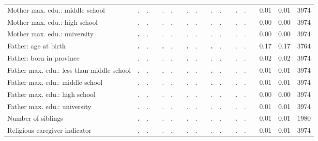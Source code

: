 \begin{tabular}{l c c c c c c c c c c c c c c c c c c}
Mother max. edu.: middle school &         . &         . & &         . &         . & &         . &         . & &         . &         . & & \textbf{        .} &         . & &      0.01 &      0.01 &      3974 \\
Mother max. edu.: high school &         . &         . & &         . &         . & &         . &         . & &         . &         . & & \textbf{        .} &         . & &      0.00 &      0.00 &      3974 \\
Mother max. edu.: university & \textbf{        .} &         . & &         . &         . & &         . &         . & &         . &         . & &         . &         . & &      0.00 &      0.00 &      3974 \\
Father: age at birth & \textbf{        .} &         . & & \textbf{        .} &         . & & \textbf{        .} &         . & & \textbf{        .} &         . & &         . &         . & &      0.17 &      0.17 &      3764 \\
Father: born in province &         . &         . & &         . &         . & & \textbf{        .} &         . & &         . &         . & &         . &         . & &      0.02 &      0.02 &      3974 \\
Father max. edu.: less than middle school & \textbf{        .} &         . & & \textbf{        .} &         . & & \textbf{        .} &         . & & \textbf{        .} &         . & &         . &         . & &      0.01 &      0.01 &      3974 \\
Father max. edu.: middle school &         . &         . & &         . &         . & &         . &         . & & \textbf{        .} &         . & & \textbf{        .} &         . & &      0.01 &      0.01 &      3974 \\
Father max. edu.: high school &         . &         . & &         . &         . & &         . &         . & &         . &         . & & \textbf{        .} &         . & &      0.00 &      0.00 &      3974 \\
Father max. edu.: university &         . &         . & &         . &         . & &         . &         . & &         . &         . & &         . &         . & &      0.01 &      0.01 &      3974 \\
Number of siblings & \textbf{        .} &         . & &         . &         . & & \textbf{        .} &         . & &         . &         . & & \textbf{        .} &         . & &      0.01 &      0.01 &      1980 \\
Religious caregiver indicator &         . &         . & &         . &         . & &         . &         . & &         . &         . & & \textbf{        .} &         . & &      0.01 &      0.01 &      3974 \\

\end{tabular}
